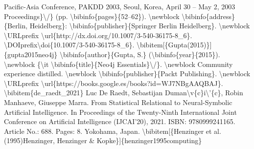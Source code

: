 \documentclass{article}%
\begin{document}
Pacific{-}Asia Conference, PAKDD 2003, Seoul, Korea, April 30 – May 2, 2003\newline%
Proceedings\}\textbackslash{}/\} (pp. \textbackslash{}bibinfo\{pages\}\{52–62\}).\newline%
\textbackslash{}newblock \textbackslash{}bibinfo\{address\}\{Berlin, Heidelberg\}: \textbackslash{}bibinfo\{publisher\}\{Springer\newline%
Berlin Heidelberg\}.\newline%
\textbackslash{}newblock \textbackslash{}URLprefix \textbackslash{}url\{http://dx.doi.org/10.1007/3{-}540{-}36175{-}8\_6\}.\newline%
\textbackslash{}DOIprefix\textbackslash{}doi\{10.1007/3{-}540{-}36175{-}8\_6\}.\newline%
\textbackslash{}bibitem{[}\{Gupta(2015)\}{]}\{gupta2015neo4j\}\newline%
\textbackslash{}bibinfo\{author\}\{Gupta, S.\} (\textbackslash{}bibinfo\{year\}\{2015\}).\newline%
\textbackslash{}newblock \{\textbackslash{}it \textbackslash{}bibinfo\{title\}\{Neo4j Essentials\}\textbackslash{}/\}.\newline%
\textbackslash{}newblock Community experience distilled.\newline%
\textbackslash{}newblock \textbackslash{}bibinfo\{publisher\}\{Packt Publishing\}.\newline%
\textbackslash{}newblock \textbackslash{}URLprefix \textbackslash{}url\{https://books.google.es/books?id=WJ7NBgAAQBAJ\}.\newline%
\textbackslash{}bibitem\{de\_raedt\_2021\}\newline%
Luc De Raedt, Sebastijan Duman\textbackslash{}v\{c\}i\textbackslash{}'\{c\}, Robin Manhaeve, Giuseppe Marra.\newline%
From Statistical Relational to Neural{-}Symbolic Artificial Intelligence.\newline%
In Proceedings of the Twenty{-}Ninth International Joint Conference on Artificial Intelligence (IJCAI'20), 2021.\newline%
ISBN: 9780999241165.\newline%
Article No.: 688.\newline%
Pages: 8.\newline%
Yokohama, Japan.\newline%
\textbackslash{}bibitem{[}\{Henzinger et al.(1995)Henzinger, Henzinger \&\newline%
Kopke\}{]}\{henzinger1995computing\}\newline%
\end{document}
